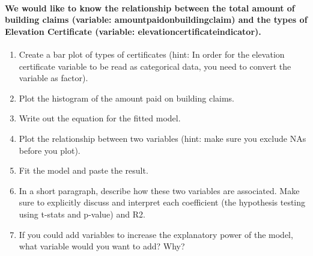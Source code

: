 \documentclass[
]{article}
\newenvironment{Shaded}{\begin{snugshade}}{\end{snugshade}}
\newcommand{\FunctionTok}[1]{\textcolor[rgb]{0.00,0.00,0.00}{#1}}
\newcommand{\NormalTok}[1]{#1}
\newcommand{\OtherTok}[1]{\textcolor[rgb]{0.56,0.35,0.01}{#1}}
\newcommand{\SpecialCharTok}[1]{\textcolor[rgb]{0.00,0.00,0.00}{#1}}
\providecommand{\tightlist}{%
  \setlength{\itemsep}{0pt}\setlength{\parskip}{0pt}}
\begin{document}
\hypertarget{we-would-like-to-know-the-relationship-between-the-total-amount-of-building-claims-variable-amountpaidonbuildingclaim-and-the-types-of-elevation-certificate-variable-elevationcertificateindicator.}{%
\paragraph{We would like to know the relationship between the total
amount of building claims (variable: amountpaidonbuildingclaim) and the
types of Elevation Certificate (variable:
elevationcertificateindicator).}\label{we-would-like-to-know-the-relationship-between-the-total-amount-of-building-claims-variable-amountpaidonbuildingclaim-and-the-types-of-elevation-certificate-variable-elevationcertificateindicator.}}

\begin{enumerate}
\def\labelenumi{\arabic{enumi}.}
\tightlist
\item
  Create a bar plot of types of certificates (hint: In order for the
  elevation certificate variable to be read as categorical data, you
  need to convert the variable as factor).
\item
  Plot the histogram of the amount paid on building claims.
\item
  Write out the equation for the fitted model.
\item
  Plot the relationship between two variables (hint: make sure you
  exclude NAs before you plot).
\item
  Fit the model and paste the result.
\item
  In a short paragraph, describe how these two variables are associated.
  Make sure to explicitly discuss and interpret each coefficient (the
  hypothesis testing using t-stats and p-value) and R2.
\item
  If you could add variables to increase the explanatory power of the
  model, what variable would you want to add? Why?
\end{enumerate}

\begin{Shaded}
\end{Shaded}
\end{document}
